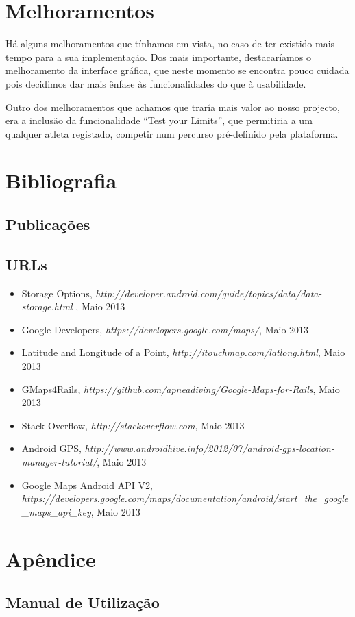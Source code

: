 \documentclass[15pt,a4paper]{article}
\begin{document}
\section{Melhoramentos}

Há alguns melhoramentos que tínhamos em vista, no caso de ter existido mais tempo para a sua implementação. Dos mais importante, destacaríamos o melhoramento da interface gráfica, que neste momento se encontra pouco cuidada pois decidimos dar mais ênfase às funcionalidades do que à usabilidade.

Outro dos melhoramentos que achamos que traría mais valor ao nosso projecto, era a inclusão da funcionalidade “Test your Limits”, que permitiria a um qualquer atleta registado, competir num percurso pré-definido pela plataforma.

\section{Bibliografia}

\subsection{Publicações}

\subsection{URLs}

\begin{itemize}
\item Storage Options, \emph{http://developer.android.com/guide/topics/data/data-storage.html
}, Maio 2013
\item Google Developers, \emph{https://developers.google.com/maps/}, Maio 2013

\item Latitude and Longitude of a Point, \emph{http://itouchmap.com/latlong.html}, Maio 2013
\item GMaps4Rails, \emph{https://github.com/apneadiving/Google-Maps-for-Rails}, Maio 2013

\item Stack Overflow, \emph{http://stackoverflow.com}, Maio 2013

\item Android GPS, \emph{http://www.androidhive.info/2012/07/android-gps-location-manager-tutorial/}, Maio 2013

\item Google Maps Android API V2, \emph{https://developers.google.com/maps/documentation/android/start\_the\_google\_maps\_api\_key}, Maio 2013

\end{itemize}



\newpage
\appendix
\section{Apêndice}
\subsection{Manual de Utilização}
\end{document}
